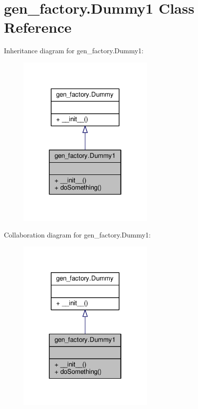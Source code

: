 \hypertarget{classgen__factory_1_1_dummy1}{}\section{gen\+\_\+factory.\+Dummy1 Class Reference}
\label{classgen__factory_1_1_dummy1}


Inheritance diagram for gen\+\_\+factory.\+Dummy1\+:
\nopagebreak
\begin{figure}[H]
\begin{center}
\leavevmode
\includegraphics[width=190pt]{classgen__factory_1_1_dummy1__inherit__graph}
\end{center}
\end{figure}


Collaboration diagram for gen\+\_\+factory.\+Dummy1\+:
\nopagebreak
\begin{figure}[H]
\begin{center}
\leavevmode
\includegraphics[width=190pt]{classgen__factory_1_1_dummy1__coll__graph}
\end{center}
\end{figure}
